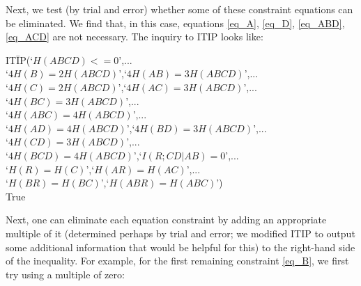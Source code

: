 \documentclass[10pt,journal]{IEEEtran}
\begin{document}
Next, we test (by trial and error) whether some of these constraint equations
can be eliminated.  We find that, in this case, equations \eqref{eq_A},
\eqref{eq_D}, \eqref{eq_ABD},  \eqref{eq_ACD} are not necessary.  The inquiry to ITIP
looks like:

\begin{tabbing}
IT\=IP(`$H(ABCD)<=0$',...\\
    \>`$4H(B)=2H(ABCD)$',`$4H(AB)=3H(ABCD)$',...\\
    \> `$4H(C)=2H(ABCD)$',`$4H(AC)=3H(ABCD)$',...\\
    \>`$4H(BC)=3H(ABCD)$',...\\
      \>`$4H(ABC)=4H(ABCD)$',...\\
      \>`$4H(AD)=4H(ABCD)$',`$4H(BD)=3H(ABCD)$',...\\
      \>`$4H(CD)=3H(ABCD)$',...\\
      \>`$4H(BCD)=4H(ABCD)$',`$I(R;CD|AB)=0$',...\\
      \>`$H(R)=H(C)$',`$H(AR)=H(AC)$',...\\
      \>`$H(BR)=H(BC)$',`$H(ABR)=H(ABC)$')\\
   True
\end{tabbing}

Next, one can eliminate each equation constraint by adding an appropriate multiple
of it (determined perhaps by trial and error; we modified ITIP to output
some additional information that would be helpful for this) to the
right-hand side of the inequality.  For example, for the first remaining constraint
\eqref{eq_B}, we first try using a multiple of zero:
\end{document}
